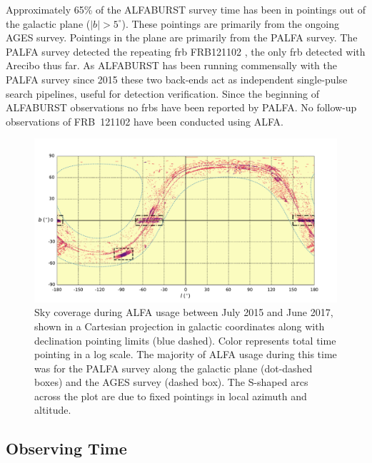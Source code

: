 \documentclass[a4paper,fleqn,usenatbib]{mnras}
\begin{document}
Approximately 65\% of the ALFABURST survey time has been in pointings out of the
galactic plane ($|b| > 5^{\circ}$).  These pointings are primarily from the
ongoing AGES survey.  Pointings in the plane are primarily from the PALFA
survey.  The PALFA survey detected the repeating \gls{frb} FRB121102
\citep{2014ApJ...790..101S}, the only \gls{frb} detected with Arecibo thus far.
As ALFABURST has been running commensally with the PALFA survey since 2015 these
two back-ends act as independent single-pulse search pipelines, useful for
detection verification.  Since the beginning of ALFABURST observations no
\glspl{frb} have been reported by PALFA. No follow-up observations of FRB~121102
have been conducted using ALFA.

\begin{figure}
    \includegraphics[width=1.0\linewidth]{figures/cartview_sky_coverage.pdf}
    \caption{Sky coverage during ALFA usage between July 2015 and June 2017,
    shown in a Cartesian projection in galactic coordinates along with
    declination pointing limits (blue dashed). Color represents total time
    pointing in a log scale. The majority of ALFA usage during this time was for
    the PALFA survey along the galactic plane (dot-dashed boxes) and the AGES
    survey (dashed box).  The S-shaped arcs across the plot are due to fixed
    pointings in local azimuth and altitude.
    }
    \label{fig:sky_coverage}
\end{figure}



\subsection{Observing Time}
\label{sec:obs_time}
\end{document}
